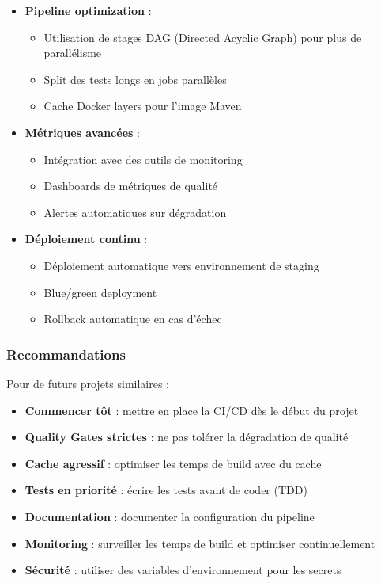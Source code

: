 \begin{itemize}
    \item \textbf{Pipeline optimization} :
    \begin{itemize}
        \item Utilisation de stages DAG (Directed Acyclic Graph) pour plus de parallélisme
        \item Split des tests longs en jobs parallèles
        \item Cache Docker layers pour l'image Maven
    \end{itemize}
    \item \textbf{Métriques avancées} :
    \begin{itemize}
        \item Intégration avec des outils de monitoring
        \item Dashboards de métriques de qualité
        \item Alertes automatiques sur dégradation
    \end{itemize}
    \item \textbf{Déploiement continu} :
    \begin{itemize}
        \item Déploiement automatique vers environnement de staging
        \item Blue/green deployment
        \item Rollback automatique en cas d'échec
    \end{itemize}
\end{itemize}

\subsubsection{Recommandations}

Pour de futurs projets similaires :
\begin{itemize}
    \item \textbf{Commencer tôt} : mettre en place la CI/CD dès le début du projet
    \item \textbf{Quality Gates strictes} : ne pas tolérer la dégradation de qualité
    \item \textbf{Cache agressif} : optimiser les temps de build avec du cache
    \item \textbf{Tests en priorité} : écrire les tests avant de coder (TDD)
    \item \textbf{Documentation} : documenter la configuration du pipeline
    \item \textbf{Monitoring} : surveiller les temps de build et optimiser continuellement
    \item \textbf{Sécurité} : utiliser des variables d'environnement pour les secrets
\end{itemize}
